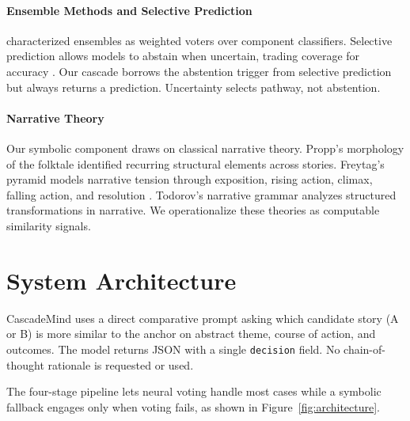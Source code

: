 \documentclass[11pt]{article}
\begin{document}
\paragraph{Ensemble Methods and Selective Prediction}
\citet{dietterich2000ensemble} characterized ensembles as weighted voters over component classifiers. Selective prediction allows models to abstain when uncertain, trading coverage for accuracy \citep{geifman2017selective}. Our cascade borrows the abstention trigger from selective prediction but always returns a prediction. Uncertainty selects pathway, not abstention.

\paragraph{Narrative Theory}
Our symbolic component draws on classical narrative theory. Propp's morphology of the folktale \citep{propp1968morphology} identified recurring structural elements across stories. Freytag's pyramid models narrative tension through exposition, rising action, climax, falling action, and resolution \citep{freytag1894technik}. Todorov's narrative grammar \citep{todorov1969grammaire} analyzes structured transformations in narrative. We operationalize these theories as computable similarity signals.


\section{System Architecture}
CascadeMind uses a direct comparative prompt asking which candidate story (A or B) is more similar to the anchor on abstract theme, course of action, and outcomes. The model returns JSON with a single \texttt{decision} field. No chain-of-thought rationale is requested or used.

The four-stage pipeline lets neural voting handle most cases while a symbolic fallback engages only when voting fails, as shown in Figure~\ref{fig:architecture}.
\end{document}
